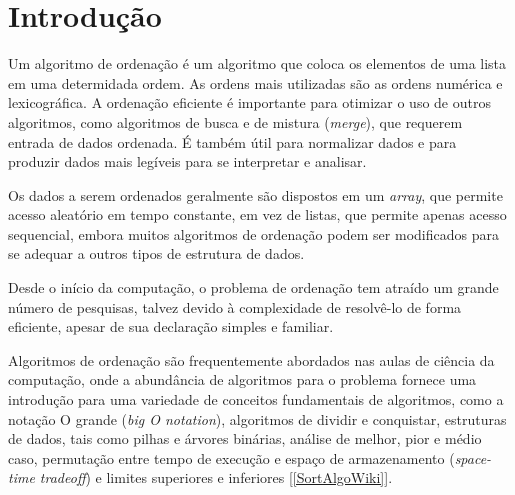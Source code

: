 \documentclass[fleqn,10pt]{SelfArx} %
\affiliation{\textsuperscript{1}\textit{Departamento de Informática, Centro Tecnológico, Universidade Federal do Espírito Santo}} %
\affiliation{\textbf{E-mail}: viniciusferracoarruda@gmail.com} %
\begin{document}
\flushbottom %

\maketitle %

\tableofcontents %

\thispagestyle{empty} %


\section{Introdução} %



Um algoritmo de ordenação é um algoritmo que coloca os elementos de uma lista em uma determidada ordem. As ordens mais 
utilizadas são as ordens numérica e lexicográfica. A ordenação eficiente é importante para otimizar o uso de outros 
algoritmos, como algoritmos de busca e de mistura (\emph{merge}), que requerem entrada de dados ordenada. É também 
útil para normalizar dados e para produzir dados mais legíveis para se interpretar e analisar.

Os dados a serem ordenados geralmente são dispostos em um \emph{array}, que permite acesso aleatório em tempo constante, 
em vez de listas, que permite apenas acesso sequencial, embora muitos algoritmos de ordenação podem ser modificados 
para se adequar a outros tipos de estrutura de dados.

Desde o início da computação, o problema de ordenação tem atraído um grande número de pesquisas, talvez devido 
à complexidade de resolvê-lo de forma eficiente, apesar de sua declaração simples e familiar.

Algoritmos de ordenação são frequentemente abordados nas aulas de ciência da computação, onde a abundância de algoritmos 
para o problema fornece uma introdução para uma variedade de conceitos fundamentais de algoritmos, como a notação O 
grande (\emph{big O notation}), algoritmos de dividir e conquistar, estruturas de dados, tais como pilhas e árvores 
binárias, análise de melhor, pior e médio caso, permutação entre tempo de execução e espaço de armazenamento 
(\emph{space-time tradeoff}) e limites superiores e inferiores [\ref{SortAlgoWiki}].
\end{document}
